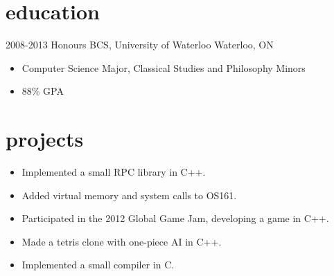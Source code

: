 \documentclass[]{zimine-cv}
\begin{document}
\section{education}

\begin{entrylist}
  \entry
    {2008-2013}
    {Honours BCS, University of Waterloo}
    {Waterloo, ON}
    {\begin{itemize}
       \item Computer Science Major, Classical Studies and Philosophy Minors
       \item 88\% GPA
    \end{itemize}}
\end{entrylist}

\section{projects}

\begin{itemize}[noitemsep]
  \item Implemented a small RPC library in C++.
  \item Added virtual memory and system calls to OS161.
  \item Participated in the 2012 Global Game Jam, developing a game in C++.
  \item Made a tetris clone with one-piece AI in C++.
  \item Implemented a small compiler in C.
\end{itemize}
\end{document}
